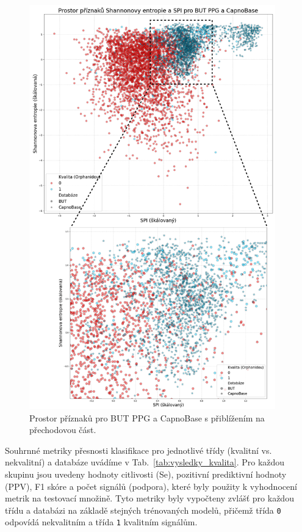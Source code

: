 \begin{figure}[ht]
	\centering
	\vspace{-7mm}
	\includegraphics[width=0.95\textwidth]{./obrazky/vysledky/scatterplot.png}
	\caption[Prostor příznaků pro BUT PPG a CapnoBase]{Prostor příznaků pro BUT PPG a CapnoBase s přiblížením na přechodovou část.}
	\vspace{-8mm}
	\label{fig:scatterplot_kvalita}
\end{figure}

\FloatBarrier
Souhrnné metriky přesnosti klasifikace pro jednotlivé třídy (kvalitní vs. nekvalitní) a databáze uvádíme v Tab.~\ref{tab:vysledky_kvalita}.
Pro každou skupinu jsou uvedeny hodnoty citlivosti (\acs{Se}), pozitivní prediktivní hodnoty (\acs{PPV}), F1 skóre a počet signálů (podpora), které byly použity k vyhodnocení metrik na testovací množině.
Tyto metriky byly vypočteny zvlášť pro každou třídu a databázi na základě stejných trénovaných modelů, přičemž třída \texttt{0} odpovídá nekvalitním a třída \texttt{1} kvalitním signálům.

